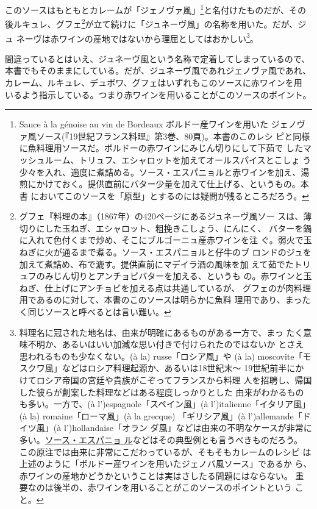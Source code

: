 \begin{recette}
このソースはもともとカレームが「ジェノヴァ風」\footnote{Sauce à la
  génoise au vin de Bordeaux ボルドー産ワインを用いた
  ジェノヴァ風ソース(『19世紀フランス料理』第3巻、80頁)。本書のこのレシ
  ピと同様に魚料理用ソースだ。ボルドーの赤ワインにみじん切りにして下茹で
  したマッシュルーム、トリュフ、エシャロットを加えてオールスパイスとこしょ
  う少々を入れ、適度に煮詰める。ソース・エスパニョルと赤ワインを加え、湯
  煎にかけておく。提供直前にバター少量を加えて仕上げる、というもの。本書
  においてこのソースを「原型」とするのには疑問が残るところだろう。}と名付けたものだが、その
後ルキュレ、グフェ\footnote{グフェ『料理の本』（1867年）の420ページにあるジュネーヴ風ソー
  スは、薄切りにした玉ねぎ、エシャロット、粗挽きこしょう、にんにく、
  バターを鍋に入れて色付くまで炒め、そこにブルゴーニュ産赤ワインを注
  ぐ。弱火で玉ねぎに火が通るまで煮る。ソース・エスパニョルと仔牛のブ
  ロンドのジュを加えて煮詰め、布で漉す。提供直前にマデイラ酒の風味を加
  えて茹でたトリュフのみじん切りとアンチョビバターを加える、というも
  の。赤ワインと玉ねぎ、仕上げにアンチョビを加える点は共通しているが、
  グフェのが肉料理用であるのに対して、本書のこのソースは明らかに魚料
  理用であり、まったく同じソースと呼べるとは言い難い。}が立て続けに「ジュネーヴ風」の名称を用いた。だが、ジュ
ネーヴは赤ワインの産地ではないから理屈としてはおかしい\footnote{料理名に冠された地名は、由来が明確にあるものがある一方で、まっ
  たく意味不明か、あるいはいい加減な思い付きで付けられたのではないか
  とさえ思われるものも少なくない。(à la) russe「ロシア風」や (à la)
  moscovite「モスクワ風」などはロシア料理起源か、あるいは18世紀末〜
  19世紀前半にかけてロシア帝国の宮廷や貴族がこぞってフランスから料理
  人を招聘し、帰国した彼らが創案した料理などはある程度しっかりとした
  由来がわかるものも多い。一方で、(à l')espagnole「スペイン風」(à
  l')italienne「イタリア風」(à la) romaine「ローマ風」(à la grecque)
  「ギリシア風」(à l')allemande「ドイツ風」(à l')hollandaise「オラン
  ダ風」などは由来の不明なケースが非常に多い。\protect\hyperlink{sauce-espagnole}{ソース・エスパニョ
  ル}などはその典型例とも言うべきものだろう。\\
  この原注では由来に非常にこだわっているが、そもそもカレームのレシピ
  は上述のように「ボルドー産ワインを用いたジェノバ風ソース」であるか
  ら、赤ワインの産地かどうかということは実はさしたる問題にはならない。
  重要なのは後半の、赤ワインを用いることがこのソースのポイントという
  こと。}。

間違っているとはいえ、ジュネーヴ風という名称で定着してしまっているので、
本書でもそのままにしている。だが、ジュネーヴ風であれジェノヴァ風であれ、
カレーム、ルキュレ、デュボワ、グフェはいずれもこのソースに赤ワインを用
いるよう指示している。つまり赤ワインを用いることがこのソースのポイント。


\end{recette}

